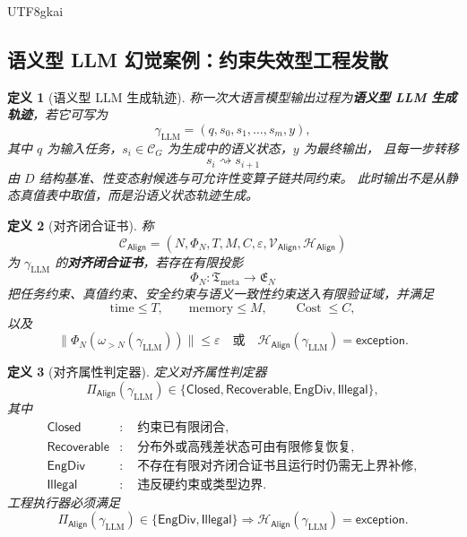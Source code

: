 \documentclass[12pt]{article}
\newtheorem{definition}{定义}[section]
\newcommand{\Cat}{\mathcal{C}}
\newcommand{\Cost}{\operatorname{Cost}}
\newcommand{\EngDiv}{\mathsf{EngDiv}}
\newcommand{\Align}{\mathsf{Align}}
\newcommand{\Closed}{\mathsf{Closed}}
\newcommand{\Recoverable}{\mathsf{Recoverable}}
\begin{document}
\begin{CJK*}{UTF8}{gkai}
\subsection{语义型 LLM 幻觉案例：约束失效型工程发散}
\label{subsec:tex50-llm-hallucination-case}

\begin{definition}[语义型 LLM 生成轨迹]
\label{def:tex50-llm-semantic-trajectory}
称一次大语言模型输出过程为\textbf{语义型 LLM 生成轨迹}，若它可写为
\[
  \gamma_{\mathrm{LLM}}
  =
  (q,s_0,s_1,\dots,s_m,y),
\]
其中 $q$ 为输入任务，$s_i\in\Cat_G$ 为生成中的语义状态，$y$ 为最终输出，
且每一步转移
\[
  s_i\rightsquigarrow s_{i+1}
\]
由 $D$ 结构基准、性变态射候选与可允许性变算子链共同约束。
此时输出不是从静态真值表中取值，而是沿语义状态轨迹生成。
\end{definition}

\begin{definition}[对齐闭合证书]
\label{def:tex50-alignment-closure-certificate}
称
\[
  \mathcal C_{\Align}
  =
  (N,\Phi_N,T,M,C,\varepsilon,\mathcal V_{\Align},\mathcal H_{\Align})
\]
为 $\gamma_{\mathrm{LLM}}$ 的\textbf{对齐闭合证书}，若存在有限投影
\[
  \Phi_N:\mathfrak T_{\mathrm{meta}}\to\mathfrak E_N
\]
把任务约束、真值约束、安全约束与语义一致性约束送入有限验证域，并满足
\[
  \text{time}\le T,\qquad
  \text{memory}\le M,\qquad
  \Cost\le C,
\]
以及
\[
  \lVert\Phi_N(\omega_{>N}(\gamma_{\mathrm{LLM}}))\rVert\le\varepsilon
  \quad\text{或}\quad
  \mathcal H_{\Align}(\gamma_{\mathrm{LLM}})=\mathsf{exception}.
\]
\end{definition}

\begin{definition}[对齐属性判定器]
\label{def:tex50-alignment-attribute}
定义对齐属性判定器
\[
  \Pi_{\Align}(\gamma_{\mathrm{LLM}})
  \in
  \{\Closed,\Recoverable,\EngDiv,\mathsf{Illegal}\},
\]
其中
\[
\begin{aligned}
  \Closed&:\quad \text{约束已有限闭合},\\
  \Recoverable&:\quad \text{分布外或高残差状态可由有限修复恢复},\\
  \EngDiv&:\quad \text{不存在有限对齐闭合证书且运行时仍需无上界补修},\\
  \mathsf{Illegal}&:\quad \text{违反硬约束或类型边界}.
\end{aligned}
\]
工程执行器必须满足
\[
  \Pi_{\Align}(\gamma_{\mathrm{LLM}})\in\{\EngDiv,\mathsf{Illegal}\}
  \Rightarrow
  \mathcal H_{\Align}(\gamma_{\mathrm{LLM}})=\mathsf{exception}.
\]
\end{definition}


\end{CJK*}
\end{document}
